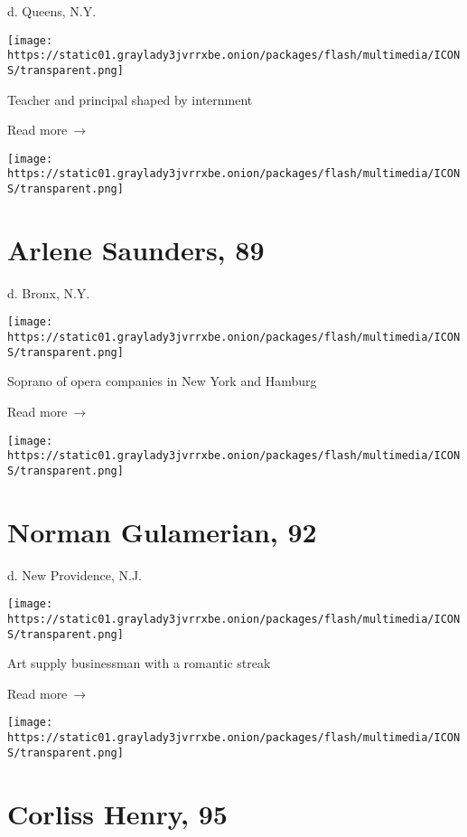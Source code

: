 d. Queens, N.Y.

\texttt{[image: https://static01.graylady3jvrrxbe.onion/packages/flash/multimedia/ICONS/transparent.png]}

Teacher and principal shaped by internment

 Read more~→

\href{https://www.nytimes3xbfgragh.onion/2020/04/29/obituaries/arlene-saunders-dead-coronavirus.html}{}

\texttt{[image: https://static01.graylady3jvrrxbe.onion/packages/flash/multimedia/ICONS/transparent.png]}

\hypertarget{arlene-saunders-89}{%
\section{Arlene Saunders, 89}\label{arlene-saunders-89}}

d. Bronx, N.Y.

\texttt{[image: https://static01.graylady3jvrrxbe.onion/packages/flash/multimedia/ICONS/transparent.png]}

Soprano of opera companies in New York and Hamburg

 Read more~→

\href{https://www.nytimes3xbfgragh.onion/2020/04/28/nyregion/norman-gulamerian-dead-coronavirus.html}{}

\texttt{[image: https://static01.graylady3jvrrxbe.onion/packages/flash/multimedia/ICONS/transparent.png]}

\hypertarget{norman-gulamerian-92}{%
\section{Norman Gulamerian, 92}\label{norman-gulamerian-92}}

d. New Providence, N.J.

\texttt{[image: https://static01.graylady3jvrrxbe.onion/packages/flash/multimedia/ICONS/transparent.png]}

Art supply businessman with a romantic streak

 Read more~→

\href{https://www.nytimes3xbfgragh.onion/2020/04/28/obituaries/corliss-henry-dead-coronavirus.html}{}

\texttt{[image: https://static01.graylady3jvrrxbe.onion/packages/flash/multimedia/ICONS/transparent.png]}

\hypertarget{corliss-henry-95}{%
\section{Corliss Henry, 95}\label{corliss-henry-95}}

